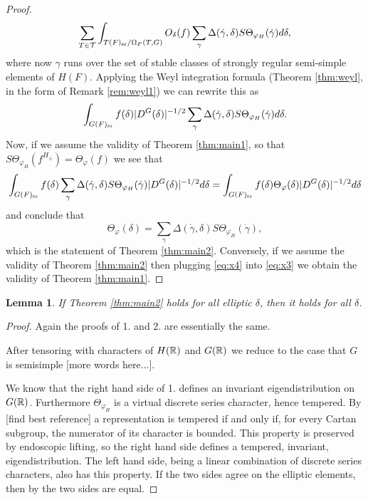 \documentclass{article}
\newtheorem{lem}[thm]{Lemma}
\theoremstyle{definition}
\numberwithin{equation}{section}
\renewcommand{\-}{\hyp{}}
\newcommand{\warn}[1]{{\leavevmode\color{red}[#1]}}
\begin{document}
\begin{proof}
\[ 
\sum_{T \in \mathcal{T}} \int_{T(F)_{\textrm{sr}}/\Omega_F(T,G)}O_\delta(f) \sum_\gamma \Delta(\dot\gamma,\delta) S\Theta_{\varphi_H}(\dot\gamma) d\delta,	
\] 
where now $\gamma$ runs over the set of stable classes of strongly regular semi-simple elements of $H(F)$. Applying the Weyl integration formula (Theorem \ref{thm:weyl}, in the form of Remark \ref{rem:weyl1}) we can rewrite this as 
\begin{equation} \label{eq:x3}
\int_{G(F)_{\textrm{sr}}}f(\delta) |D^G(\delta)|^{-1/2}\sum_\gamma \Delta(\dot\gamma,\delta) S\Theta_{\varphi_H}(\dot\gamma) d\delta.
\end{equation}
Now, if we assume the validity of Theorem \ref{thm:main1}, so that $S\Theta_{\varphi_H}(f^{H_\pm}) = \Theta_\varphi(f)$ we see that 
\[ \int_{G(F)_{\textrm{sr}}}f(\delta) \sum_\gamma \Delta(\dot\gamma,\delta) S\Theta_{\varphi_H}(\dot\gamma) |D^G(\delta)|^{-1/2}d\delta = \int_{G(F)_{\textrm{sr}}}f(\delta) \Theta_\varphi(\delta)|D^G(\delta)|^{-1/2} d\delta \]
and conclude that 
\begin{equation} \label{eq:x4}
\Theta_\varphi(\delta) = \sum_\gamma \Delta(\dot\gamma,\delta) S\Theta_{\varphi_H}(\dot\gamma),
\end{equation}
which is the statement of Theorem \ref{thm:main2}. Conversely, if we assume the validity of Theorem \ref{thm:main2} then plugging \eqref{eq:x4} into \eqref{eq:x3} we obtain the validity of Theorem \ref{thm:main1}.
\end{proof}

\begin{lem}
If Theorem \ref{thm:main2} holds for all elliptic $\delta$, then it holds for all $\delta$.
\end{lem}
\begin{proof}
  Again the proofs of 1. and 2. are essentially the same.

  After tensoring with characters of $H(\mathbb{R})$ and $G(\mathbb{R})$ we reduce to the case that $G$ is semisimple \warn{more words here...}.

  We know that the right hand side of 1. defines an invariant eigendistribution on $G(\mathbb{R})$.
  Furthermore  $\Theta_{\varphi_H}$ is a virtual discrete series character, hence tempered.
  By [find best reference] a representation is tempered if and only if, for every Cartan subgroup, the numerator of its character
  is bounded. This property is preserved by endoscopic lifting, so the right hand side defines a tempered, invariant, eigendistribution.
  The left hand side, being a linear combination of discrete series characters, also has this property.
  If the two sides agree on the elliptic elements, then by  \cite[Theorem 2]{HCDSI} the two sides are equal.
\end{proof}
\end{document}
